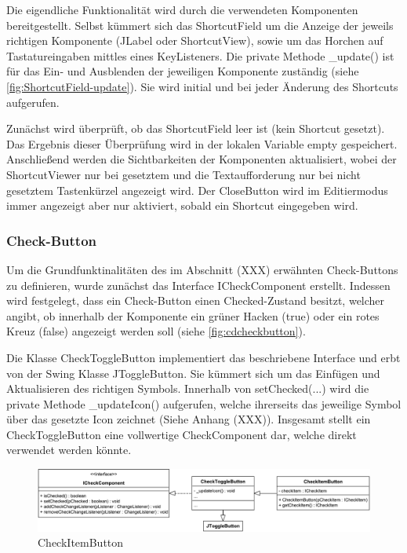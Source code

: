Die eigendliche Funktionalität wird durch die verwendeten Komponenten bereitgestellt. Selbst kümmert sich das ShortcutField um die Anzeige der jeweils richtigen Komponente (JLabel oder ShortcutView), sowie um das Horchen auf Tastatureingaben mittles eines KeyListeners. Die private Methode \_update() ist für das Ein- und Ausblenden der jeweiligen Komponente zuständig (siehe \autoref{fig:ShortcutField-update}). Sie wird initial und bei jeder Änderung des Shortcuts aufgerufen.



Zunächst wird überprüft, ob das ShortcutField leer ist (kein Shortcut gesetzt). Das Ergebnis dieser Überprüfung wird in der lokalen Variable empty gespeichert. Anschließend werden die Sichtbarkeiten der Komponenten aktualisiert, wobei der ShortcutViewer nur bei gesetztem und die Textaufforderung nur bei nicht gesetztem Tastenkürzel angezeigt wird. Der CloseButton wird im Editiermodus immer angezeigt aber nur aktiviert, sobald ein Shortcut eingegeben wird.

\newpage

\subsubsection{Check-Button}

Um die Grundfunktinalitäten des im Abschnitt (XXX) erwähnten Check-Buttons zu definieren, wurde zunächst das Interface ICheckComponent erstellt. Indessen wird festgelegt, dass ein Check-Button einen Checked-Zustand besitzt, welcher angibt, ob innerhalb der Komponente ein grüner Hacken (true) oder ein rotes Kreuz (false) angezeigt werden soll (siehe \autoref{fig:cdcheckbutton}).

Die Klasse CheckToggleButton implementiert das beschriebene Interface und erbt von der Swing Klasse JToggleButton. Sie kümmert sich um das Einfügen und Aktualisieren des richtigen Symbols. Innerhalb von setChecked(...) wird die private Methode \_updateIcon() aufgerufen, welche ihrerseits das jeweilige Symbol über das gesetzte Icon zeichnet (Siehe Anhang (XXX)). Insgesamt stellt ein CheckToggleButton eine vollwertige CheckComponent dar, welche direkt verwendet werden könnte.

\begin{figure}[H]
	\centering
	\includegraphics[width=1\linewidth]{../graphic/diagrams/CD_CheckButton/CD_CheckButton}
	\caption{CheckItemButton}
	\label{fig:cdcheckbutton}
\end{figure}

